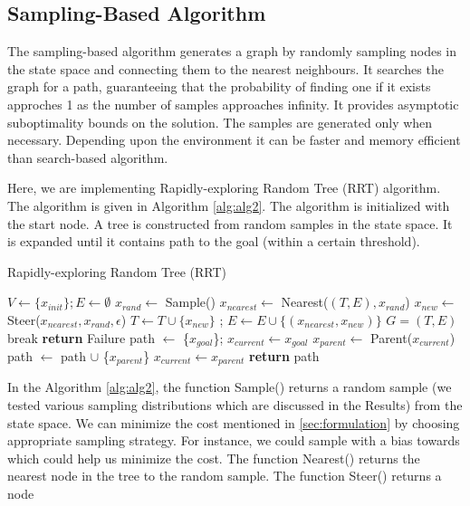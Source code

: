 \documentclass[conference]{IEEEtran}
\begin{document}
\subsection{Sampling-Based Algorithm}
The sampling-based algorithm generates a graph by randomly sampling nodes in the state space and connecting them to the nearest neighbours. It searches the graph for a path, guaranteeing that the probability of finding one if 
it exists approches 1 as the number of samples approaches infinity. It provides asymptotic suboptimality bounds on the solution. The samples are generated only when necessary. Depending upon the environment it can be faster
and memory efficient than search-based algorithm.
\par Here, we are implementing Rapidly-exploring Random Tree (RRT) algorithm. The algorithm is given in Algorithm \ref{alg:alg2}. The algorithm is initialized with the start node. A tree is constructed from random samples 
in the state space. It is expanded until it contains path to the goal (within a certain threshold).
\begin{algorithm}
\caption{Rapidly-exploring Random Tree (RRT)}
\label{alg:alg2}
\begin{algorithmic}
\STATE $V \gets \{x_{init}\}; E \gets \emptyset$
\STATE $x_{rand} \gets$ Sample()
\STATE $x_{nearest} \gets$ Nearest($(T, E), x_{rand}$)
\STATE $x_{new} \gets$ Steer($x_{nearest}, x_{rand}, \epsilon$)
\STATE $T \gets T \cup \{x_{new}\}$ ; $E \gets E \cup \{(x_{nearest}, x_{new})\}$
\STATE $G = (T, E)$
\STATE break
\ENDIF
\ENDIF
\ENDFOR
{}
\STATE \textbf{return} Failure
\ENDIF
\STATE path $\gets$ \{$x_{goal}$\}; $x_{current} \gets x_{goal}$
\STATE $x_{parent} \gets$ Parent($x_{current}$)
\STATE path $\gets$ path $\cup$ \{$x_{parent}$\}
\STATE $x_{current} \gets x_{parent}$
\ENDWHILE
\STATE \textbf{return} path
\end{algorithmic}
\end{algorithm}
\par In the Algorithm \ref{alg:alg2}, the function Sample() returns a random sample (we tested various sampling distributions which are discussed in the Results) from the state space. We can minimize the cost mentioned in \ref{sec:formulation} by choosing appropriate sampling strategy. For instance, we could sample with a bias towards which could help us minimize the cost. The function Nearest() returns the nearest node in the tree to the random sample. The function Steer() returns a node
\end{document}
